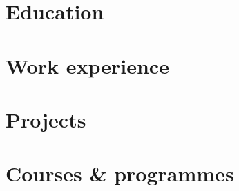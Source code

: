 \documentclass[]{resume}
\begin{document}
\begin{adjustwidth}{10pt}{10pt}

\section*{Education}


\renewcommand{\twentylen}{\itemwidth}
\begin{twenty}[\chronowidth]
    
\end{twenty}



\section*{Work experience}
\renewcommand{\twentylen}{\itemwidth}
\begin{twenty}[\chronowidth]
    
    
\end{twenty}


\section*{Projects}

\renewcommand{\twentylen}{\itemwidth}
\begin{twenty}[\chronowidth]
  
  
\end{twenty}



\section*{Courses \& programmes}

\renewcommand{\twentylen}{\itemwidth}
\begin{twenty}[\chronowidth]
    
    
    
    
\end{twenty}


\end{adjustwidth}

\end{document}
